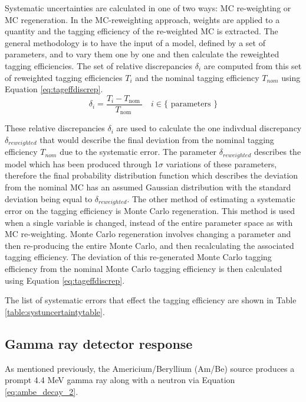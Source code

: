 Systematic uncertainties are calculated in one of two ways: MC re-weighting or MC regeneration. In the MC-reweighting approach, weights are applied to a quantity and the tagging efficiency of the re-weighted MC is extracted. The general methodology is to have the input of a model, defined by a set of parameters, and to vary them one by one and then calculate the reweighted tagging efficiencies. The set of relative discrepancies $\delta_{i}$ are computed from this set of reweighted tagging efficiencies $T_{i}$ and the nominal tagging efficiency $T_{nom}$ using Equation \ref{eq:tageffdiscrep}.
\newline
\begin{equation}
    \delta_{i}=\frac{T_{i}-T_{\text {nom }}}{T_{\text {nom }}} \quad i \in\{\text { parameters }\}
\label{eq:tageffdiscrep}
\end{equation}
\newline

These relative discrepancies $\delta_{i}$ are used to calculate the one indivdual discrepancy $\delta_{reweighted}$ that would describe the final deviation from the nominal tagging efficiency $T_{nom}$ due to the systematic error. The parameter $\delta_{reweighted}$ describes the model which has been produced through 1$\sigma$ variations of these parameters, therefore the final probability distribution function which describes the deviation from the nominal MC has an assumed Gaussian distribution with the standard deviation being equal to $\delta_{reweighted}$. 
\newline
The other method of estimating a systematic error on the tagging efficiency is Monte Carlo regeneration. This method is used when a single variable is changed, instead of the entire parameter space as with MC re-weighting. Monte Carlo regeneration involves changing a parameter and then re-producing the entire Monte Carlo, and then recalculating the associated tagging efficiency. The deviation of this re-generated Monte Carlo tagging efficiency from the nominal Monte Carlo tagging efficiency is then calculated using Equation \ref{eq:tageffdiscrep}.


The list of systematic errors that effect the tagging efficiency are shown in Table \ref{table:systuncertaintytable}. 

\subsection{Gamma ray detector response}

As mentioned previously, the Americium/Beryllium (Am/Be) source produces a prompt 4.4 MeV gamma ray along with a neutron via Equation \ref{eq:ambe_decay_2}. 

